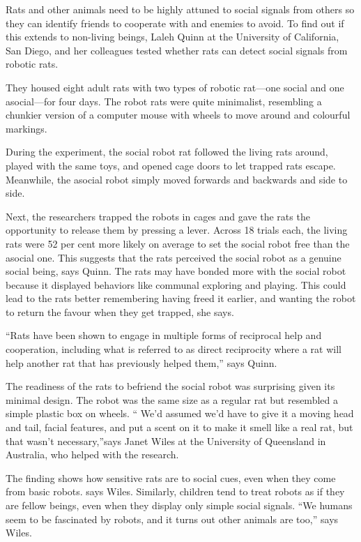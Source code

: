Rats and other animals need to be highly attuned to social signals from others so they can identify friends to cooperate with and enemies to avoid. To find out if this extends to non-living beings, Laleh Quinn at the University of California, San Diego, and her colleagues tested whether rats can detect social signals from robotic rats.


They housed eight adult rats with two types of robotic rat—one social and one asocial—for four days. The robot rats were quite minimalist, resembling a chunkier version of a computer mouse with wheels to move around and colourful markings.


During the experiment, the social robot rat followed the living rats around, played with the same toys, and opened cage doors to let trapped rats escape. Meanwhile, the asocial robot simply moved forwards and backwards and side to side.


Next, the researchers trapped the robots in cages and gave the rats the opportunity to release them by pressing a lever. Across 18 trials each, the living rats were 52 per cent more likely on average to set the social robot free than the asocial one. This suggests that the rats perceived the social robot as a genuine social being, says Quinn. The rats may have bonded more with the social robot because it displayed behaviors like communal exploring and playing. This could lead to the rats better remembering having freed it earlier, and wanting the robot to return the favour when they get trapped, she says.


``Rats have been shown to engage in multiple forms of reciprocal help and cooperation, including what is referred to as direct reciprocity where a rat will help another rat that has previously helped them,'' says Quinn.


The readiness of the rats to befriend the social robot was surprising given its minimal design. The robot was the same size as a regular rat but resembled a simple plastic box on wheels. `` We'd assumed we'd have to give it a moving head and tail, facial features, and put a scent on it to make it smell like a real rat, but that wasn't necessary,''says Janet Wiles at the University of Queensland in Australia, who helped with the research.


The finding shows how sensitive rats are to social cues, even when they come from basic robots. says Wiles. Similarly, children tend to treat robots as if they are fellow beings, even when they display only simple social signals. ``We humans seem to be fascinated by robots, and it turns out other animals are too,'' says Wiles.


